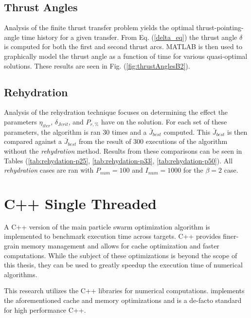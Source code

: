 \subsection{Thrust Angles}

\noindent Analysis of the finite thrust transfer problem yields the optimal thrust-pointing-angle time history for a given transfer. 
From Eq. (\ref{delta_eq}) the thrust angle $\delta$ is computed for both the first and second thrust arcs. MATLAB is then used
to graphically model the thrust angle as a function of time for various quasi-optimal solutions. These results are seen in 
Fig. (\ref{fig:thrustAnglesB2}). \newline

\subsection{Rehydration}

\noindent Analysis of the rehydration technique focuses on determining the effect the parameters $\eta_{iter}$, $\delta_{Jcrit}$,
and $P_{r,\text{\%}}$ have on the solution. For each set of these parameters, the algorithm is ran 30 times and a $\bar{J}_{best}$
computed. This $\bar{J}_{best}$ is then compared against a $\bar{J}_{best}$ from the result of 300 executions of the algorithm without
the \textit{rehydration} method. Results from these comparisons can be seen in Tables 
(\ref{tab:rehydation-p25}, \ref{tab:rehydation-p33}, \ref{tab:rehydation-p50}).
All \textit{rehydration} cases are ran with $P_{num} = 100$ and $I_{num} = 1000$ for the $\beta=2$ case.



\section{C++ Single Threaded}

\noindent A C++ version of the main particle swarm optimization algorithm is implemented to benchmark execution time across targets.
C++ provides finer-grain memory management and allows for cache optimization and faster computations.
While the subject of these optimizations is beyond the scope of this thesis, they can be used to greatly speedup the execution time
of numerical algorithms. \newline

\noindent This research utilizes the C++  libraries for numerical computations.
 implements the aforementioned cache and memory optimizations and is a de-facto standard
for high performance C++.

